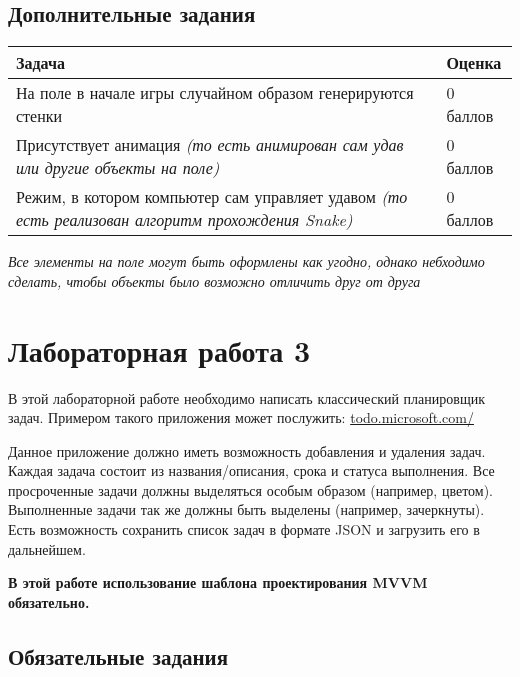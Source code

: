 \documentclass[a4paper, 13pt]{article}
\newcommand{\labstablefraction}{1/10}
\newcommand{\labstablescore}{\textwidth * \labstablefraction}
\newcommand{\labstabletask}{\textwidth * (1 - \labstablefraction) - \labstablescore - 0.83cm}
\begin{document}
\subsection{Дополнительные задания}

\begin{table}[hbt]
\begin{tabular}{|p{\labstabletask}|p{\labstablescore}|}
\hline
Задача
& Оценка   \\ \hline
На поле в начале игры случайном образом генерируются стенки
& 0 баллов \\ \hline
Присутствует анимация \textit{(то есть анимирован сам удав или другие объекты на поле)}
& 0 баллов \\ \hline
Режим, в котором компьютер сам управляет удавом \textit{(то есть реализован алгоритм прохождения Snake)}
& 0 баллов \\ \hline
\end{tabular}
\end{table}

\textit{Все элементы на поле могут быть оформлены как угодно, однако небходимо сделать, чтобы объекты было возможно отличить друг от друга}

\newpage

\section{Лабораторная работа 3}

В этой лабораторной работе необходимо написать классический планировщик задач. Примером такого приложения может послужить: \url{todo.microsoft.com/}

Данное приложение должно иметь возможность добавления и удаления задач. Каждая задача состоит из названия/описания, срока и статуса выполнения. Все просроченные задачи должны выделяться особым образом (например, цветом). Выполненные задачи так же должны быть выделены (например, зачеркнуты). Есть возможность сохранить список задач в формате JSON и загрузить его в дальнейшем.

\textbf{В этой работе использование шаблона проектирования MVVM обязательно.}

\subsection{Обязательные задания}
\end{document}

